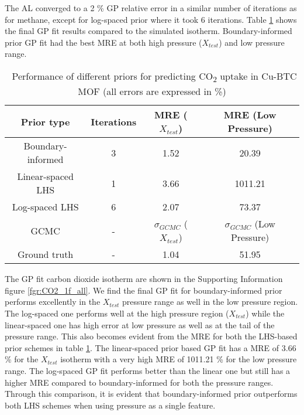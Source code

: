\documentclass[twoside,twocolumn,9pt]{article}
\begin{document}
The AL converged to a 2 \% GP relative error in a similar number of iterations as for methane, except for log-spaced prior where it took 6 iterations. Table \ref{tbl:CO2_1f} shows the final GP fit results compared to the simulated isotherm. Boundary-informed prior GP fit had the best MRE at both high pressure ($X_{test}$) and low pressure range.
\begin{table}[ht]
\small
  \caption{\ Performance of different priors for predicting CO\textsubscript{2} uptake in Cu-BTC MOF (all errors are expressed in \%)} 
  \label{tbl:CO2_1f}
  \begin{tabular*}{0.48\textwidth}{@{\extracolsep{\fill}}cccc}
    \hline
   Prior type & Iterations & MRE ($X_{test}$) & MRE (Low Pressure)\\
    \hline
    Boundary-informed & 3 & 1.52 & 20.39\\
    Linear-spaced LHS & 1 & 3.66 & 1011.21\\
    Log-spaced LHS & 6 & 2.07 & 73.37\\
    \hline
    GCMC & - & $\sigma_{GCMC}$ ($X_{test}$) & $\sigma_{GCMC}$ (Low Pressure)\\ 
    \hline
    Ground truth & - & 1.04 & 51.95\\
    \hline
  \end{tabular*}
\end{table}

The GP fit carbon dioxide isotherm are shown in the Supporting Information figure \ref{fgr:CO2_1f_all}. We find the final GP fit for boundary-informed prior performs excellently in the $X_{test}$ pressure range as well in the low pressure region. The log-spaced one performs well at the high pressure region ($X_{test}$) while the linear-spaced one has high error at low pressure as well as at the tail of the pressure range. This also becomes evident from the MRE for both the LHS-based prior schemes in table \ref{tbl:CO2_1f}. The linear-spaced prior based GP fit has a MRE of 3.66 \% for the $X_{test}$ isotherm with a very high MRE of 1011.21 \% for the low pressure range. The log-spaced GP fit performs better than the linear one but still has a higher MRE compared to boundary-informed for both the pressure ranges. Through this comparison, it is evident that boundary-informed prior outperforms both LHS schemes when using pressure as a single feature. 
\end{document}

